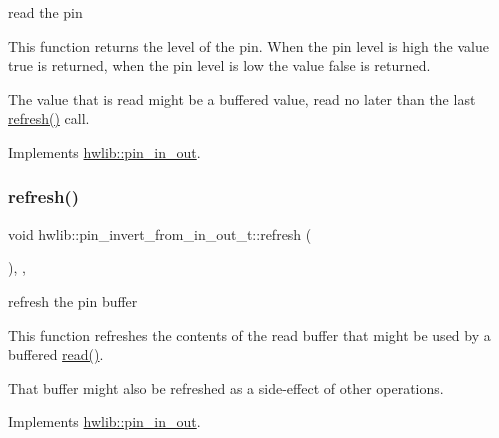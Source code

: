 read the pin

This function returns the level of the pin. When the pin level is high the value true is returned, when the pin level is low the value false is returned.

The value that is read might be a buffered value, read no later than the last \hyperlink{classhwlib_1_1pin__invert__from__in__out__t_a3cb25b54497d924b0b7206af9524d675}{refresh()} call. 

Implements \hyperlink{classhwlib_1_1pin__in__out_a5caebc7ab9fe49b7e020b89f0a2cf892}{hwlib\+::pin\+\_\+in\+\_\+out}.

\mbox{\label{classhwlib_1_1pin__invert__from__in__out__t_a3cb25b54497d924b0b7206af9524d675}} 
\subsubsection{\texorpdfstring{refresh()}{refresh()}}
{\footnotesize\ttfamily void hwlib\+::pin\+\_\+invert\+\_\+from\+\_\+in\+\_\+out\+\_\+t\+::refresh (\begin{DoxyParamCaption}{ }\end{DoxyParamCaption})\hspace{0.3cm}{\ttfamily [inline]}, {\ttfamily [override]}, {\ttfamily [virtual]}}

refresh the pin buffer

This function refreshes the contents of the read buffer that might be used by a buffered \hyperlink{classhwlib_1_1pin__invert__from__in__out__t_a36432019f4ab69ea26255b70641599bd}{read()}.

That buffer might also be refreshed as a side-\/effect of other operations. 

Implements \hyperlink{classhwlib_1_1pin__in__out_a8815baac4e5193ec68795956f5e363a6}{hwlib\+::pin\+\_\+in\+\_\+out}.

\mbox{\label{classhwlib_1_1pin__invert__from__in__out__t_a6569f8c7c0b1591cc61d1b76736dec76}} 
